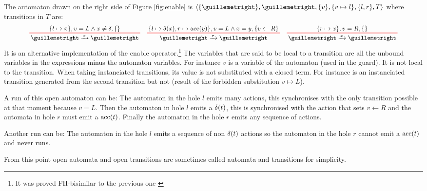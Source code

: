 \documentclass{article}
\begin{document}
\begin{exi}
The automaton drawn on the right side of Figure \ref{fig:enable} is \(\OA{\mbrc{»}}{»}{\mbrc{v}}{\mbrc{v \mapsto l}}{\mbrc{l, r}}{T}\) where transitions in \(T\) are:
\begin{align*}
	\OT{»}{»}{x}{\mbrc{l \mapsto x}}{v = L \wedge x \neq \delta}{\mbrc{}} &&
	\OT{»}{»}{\tau}{\mbrc{l \mapsto \delta\mpar{x}, r \mapsto \act{acc}\mpar{y}}}{v = L \wedge x = y}{\mbrc{v \gets R}} &&
	\OT{»}{»}{x}{\mbrc{r \mapsto x}}{v = R}{\mbrc{}}
\end{align*}
It is an alternative implementation of the enable operator.\footnote{It was proved FH-bisimilar to the previous one \cite{henrio:01299562}}
The variables that are said to be local to a transition are all the unbound variables in the expressions minus the automaton variables.
For instance \(v\) is a variable of the automaton (used in the guard).
It is not local to the transition.
When taking instanciated transitions, its value is not substituted with a closed term.
For instance  is an instanciated transition generated from the second transition but not  (result of the forbidden substitution \(v \mapsto L\)).

A run of this open automaton can be: The automaton in the hole \(l\) emits many actions, this synchronises with the only transition possible at that moment because \(v = L\).
Then the automaton in hole \(l\) emits a \(\delta{\left(t\right)}\), this is synchronised with the action that sets \(v \gets R\) and the automata in hole \(r\) must emit a \(\mathrm{acc}{\left(t\right)}\).
Finally the automaton in the hole \(r\) emits any sequence of actions.

Another run can be: The automaton in the hole \(l\) emits a sequence of non \(\delta{\left(t\right)}\) actions so the automaton in the hole \(r\) cannot emit a \(\mathrm{acc}{\left(t\right)}\) and never runs.
\end{exi}
From this point open automata and open transitions are sometimes called automata and transitions for simplicity. %
\end{document}
